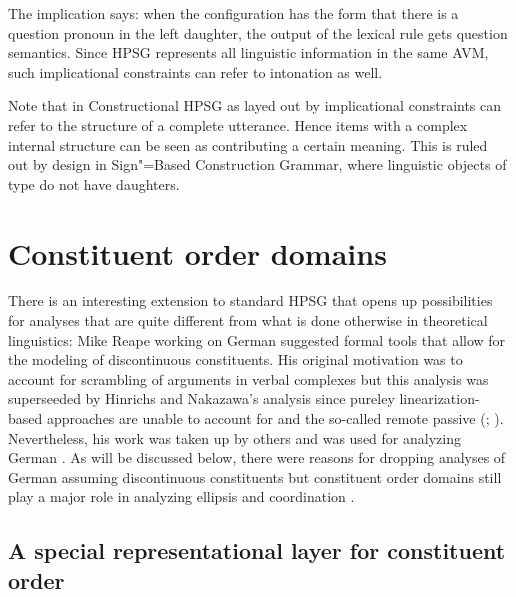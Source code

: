 \documentclass[output=paper]{langsci/langscibook}
\begin{document}
The implication says: when the configuration has the form that there is a question pronoun in the
left daughter, the output of the lexical rule gets question semantics. Since HPSG represents all
linguistic information in the same AVM, such implicational constraints can refer to intonation as well.

Note that in Constructional HPSG as layed out by  implicational constraints can refer
to the structure of a complete utterance. Hence items with a complex internal structure can be seen
as contributing a certain meaning. This is ruled out by design in Sign"=Based Construction Grammar,
where linguistic objects of type  do not have daughters.


\section{Constituent order domains}
\label{sec-domains}

There is an interesting extension to standard HPSG that opens up possibilities for analyses that are
quite different from what is done otherwise in theoretical linguistics: Mike Reape
\citeyearpar{Reape91,Reape92a,Reape94a} working on German suggested formal tools that allow for the modeling of
discontinuous constituents. His original motivation was to account for scrambling of arguments in
verbal complexes but this analysis was superseeded by Hinrichs and Nakazawa's analysis
\citep{HN89a,HN94a} since pureley linearization-based approaches are unable to account for 
and the so-called remote passive (\citealp[Section~5.1, Section~5.2]{Kathol98b};
\citealp[Chapter~21.1]{Mueller99a}). Nevertheless, his work was taken up by others and was used for analyzing German
\citep{KP95a,Kathol2000a,Mueller95c,Babel,Mueller2004b,Wetta2011a,Wetta2014a-u}. As will be
discussed below, there were reasons for dropping analyses of German assuming discontinuous constituents \citep{Mueller2005d,MuellerGS} but constituent order
domains still play a major role in analyzing ellipsis  and
coordination .

\subsection{A special representational layer for constituent order}
\end{document}
